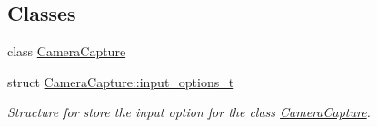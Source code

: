 \subsection*{Classes}
\begin{DoxyCompactItemize}
\item 
class \mbox{\hyperlink{class_camera_capture}{Camera\+Capture}}
\item 
struct \mbox{\hyperlink{struct_camera_capture_1_1input__options__t}{Camera\+Capture\+::input\+\_\+options\+\_\+t}}
\begin{DoxyCompactList}\small\item\em Structure for store the input option for the class \mbox{\hyperlink{class_camera_capture}{Camera\+Capture}}. \end{DoxyCompactList}\end{DoxyCompactItemize}
